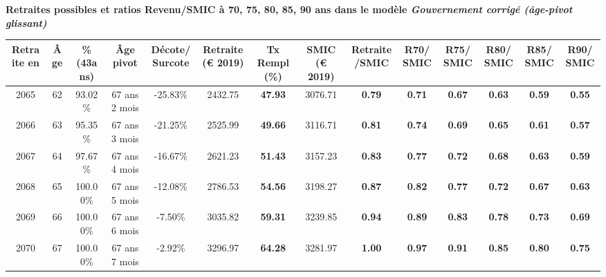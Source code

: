  \vspace{0.1cm} 
{\bf \noindent Retraites possibles et ratios Revenu/SMIC à 70, 75, 80, 85, 90 ans dans le modèle \emph{Gouvernement corrigé (âge-pivot glissant)}}  
 
\begin{adjustbox}{max width=\textwidth} 
\begin{tabular}[htb]{|c|c||c|c|c||c|c||c|c||c|c|c|c|c|} 
\hline 
 Retraite en &  Âge &  \%(43ans) &  Âge pivot &  Décote/Surcote &  Retraite (\euro{} 2019) &  Tx Rempl(\%) &  SMIC (\euro{} 2019) &  Retraite/SMIC &  R70/SMIC &  R75/SMIC &  R80/SMIC &  R85/SMIC &  R90/SMIC \\ 
\hline \hline 
 2065 &  62 &  93.02\% &  67 ans 2 mois &  -25.83\% &  2432.75 &  {\bf 47.93} &  3076.71 &  {\bf {\color{red} 0.79}} &  {\bf {\color{red} 0.71}} &  {\bf {\color{red} 0.67}} &  {\bf {\color{red} 0.63}} &  {\bf {\color{red} 0.59}} &  {\bf {\color{red} 0.55}} \\ 
\hline 
 2066 &  63 &  95.35\% &  67 ans 3 mois &  -21.25\% &  2525.99 &  {\bf 49.66} &  3116.71 &  {\bf {\color{red} 0.81}} &  {\bf {\color{red} 0.74}} &  {\bf {\color{red} 0.69}} &  {\bf {\color{red} 0.65}} &  {\bf {\color{red} 0.61}} &  {\bf {\color{red} 0.57}} \\ 
\hline 
 2067 &  64 &  97.67\% &  67 ans 4 mois &  -16.67\% &  2621.23 &  {\bf 51.43} &  3157.23 &  {\bf {\color{red} 0.83}} &  {\bf {\color{red} 0.77}} &  {\bf {\color{red} 0.72}} &  {\bf {\color{red} 0.68}} &  {\bf {\color{red} 0.63}} &  {\bf {\color{red} 0.59}} \\ 
\hline 
 2068 &  65 &  100.00\% &  67 ans 5 mois &  -12.08\% &  2786.53 &  {\bf 54.56} &  3198.27 &  {\bf {\color{red} 0.87}} &  {\bf {\color{red} 0.82}} &  {\bf {\color{red} 0.77}} &  {\bf {\color{red} 0.72}} &  {\bf {\color{red} 0.67}} &  {\bf {\color{red} 0.63}} \\ 
\hline 
 2069 &  66 &  100.00\% &  67 ans 6 mois &  -7.50\% &  3035.82 &  {\bf 59.31} &  3239.85 &  {\bf {\color{red} 0.94}} &  {\bf {\color{red} 0.89}} &  {\bf {\color{red} 0.83}} &  {\bf {\color{red} 0.78}} &  {\bf {\color{red} 0.73}} &  {\bf {\color{red} 0.69}} \\ 
\hline 
 2070 &  67 &  100.00\% &  67 ans 7 mois &  -2.92\% &  3296.97 &  {\bf 64.28} &  3281.97 &  {\bf 1.00} &  {\bf {\color{red} 0.97}} &  {\bf {\color{red} 0.91}} &  {\bf {\color{red} 0.85}} &  {\bf {\color{red} 0.80}} &  {\bf {\color{red} 0.75}} \\ 
\hline 
\hline 
\end{tabular} 
\end{adjustbox} 
 
